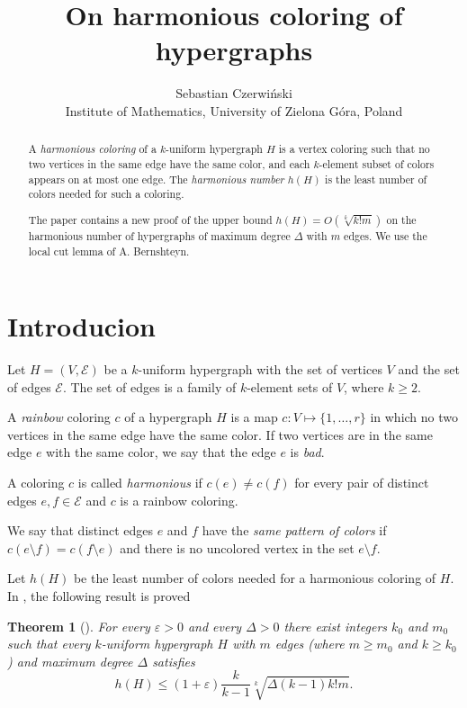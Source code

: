 \documentclass{article}
\author{Sebastian Czerwi\'nski\\ 
Institute of Mathematics, University of Zielona G\'{o}ra, Poland}
\title{On harmonious coloring of hypergraphs}
\newtheorem{theorem}{Theorem}
\begin{document}

\maketitle

\begin{abstract}
A \emph{harmonious coloring} of a $k$-uniform hypergraph $H$ is a vertex coloring such that no two vertices in the same edge have the same color,  and each $k$-element subset of colors appears on at most one edge. The \emph{harmonious number} $h(H)$ is the least number of colors needed for such a coloring. 
			
The paper contains a new proof of the upper bound $h(H)=O(\sqrt[k]{k!m})$ on the harmonious number of hypergraphs of maximum degree $\Delta$ with $m$ edges. We use the local cut lemma of A. Bernshteyn.
\end{abstract}
	
\section{Introducion}

	Let $H=(V,\mathcal{E})$ be a $k$-uniform hypergraph with the set of vertices $V$ and the set of edges $\mathcal{E}$. The set of edges is a family of $k$-element sets of $V$, where $k\geq 2$.
	
	A \emph{rainbow} coloring $c$ of a hypergraph $H$ is a map $c: V \mapsto\{1,\ldots,r\}$ in which no two vertices in the same edge have the same color. If two vertices are in the same edge $e$ with the same color, we say that the edge $e$ is \emph{bad}.
	
	A coloring $c$ is called \emph{harmonious} if $c(e)\neq c(f)$ for every pair of distinct edges $e,f\in\mathcal{E}$ and $c$ is a rainbow coloring.
	
	We say that distinct edges $e$ and $f$ have the \emph{same pattern of colors} if $c(e \setminus f)=c(f \setminus e)$ and there is no uncolored vertex in the set $e \setminus f$.
	
	Let $h(H)$ be the least number of colors needed for a harmonious coloring of $H$.
	In \cite{Bosek}, the following result is proved
	\begin{theorem}[\cite{Bosek}]
		For every $\varepsilon>0$ and every $\Delta>0$ there exist integers $k_0$ and $m_0$ such that every $k$-uniform hypergraph $H$ with $m$ edges (where $m\geq m_0$ and $k\geq k_0$) and maximum degree $\Delta$ satisfies
		\[h(H)\leq(1+\varepsilon)\frac{k}{k-1}\sqrt[k]{\Delta(k-1)k!m}.\]
	\end{theorem}
 
\end{document}
